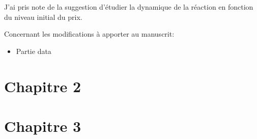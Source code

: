 \documentclass[11pt]{article}
\begin{document}
J'ai pris note de la suggestion d'étudier la dynamique de la réaction en fonction du niveau initial du prix.

Concernant les modifications à apporter au manuscrit:
\begin{itemize}
\item Partie data
\end{itemize}

\section{Chapitre 2}



\section{Chapitre 3}
\end{document}
